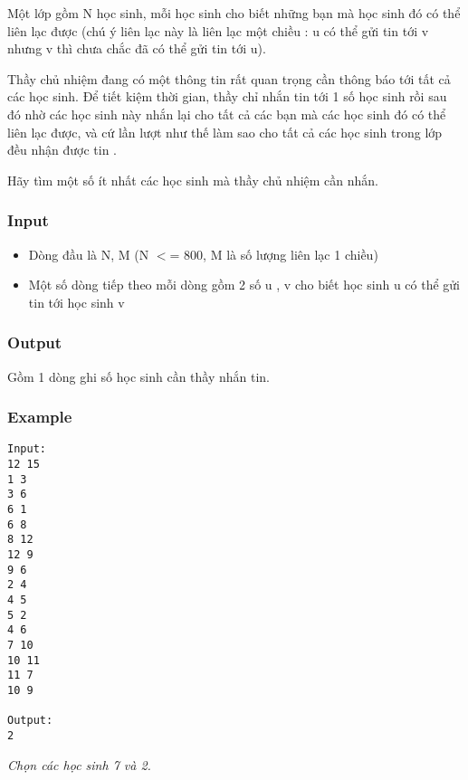 

Một lớp gồm N học sinh, mỗi học sinh cho biết những bạn mà học sinh đó có thể liên lạc được (chú ý liên lạc này là liên lạc một chiều : u có thể gửi tin tới v nhưng v thì chưa chắc đã có thể gửi tin tới u).

Thầy chủ nhiệm đang có một thông tin rất quan trọng cần thông báo tới tất cả các học sinh. Để tiết kiệm thời gian, thầy chỉ nhắn tin tới 1 số học sinh rồi sau đó nhờ các học sinh này nhắn lại cho tất cả các bạn mà các học sinh đó có thể liên lạc được, và cứ lần lượt như thế làm sao cho tất cả các học sinh trong lớp đều nhận được tin .

Hãy tìm một số ít nhất các học sinh mà thầy chủ nhiệm cần nhắn.

\subsubsection{Input}
\begin{itemize}
	\item Dòng đầu là N, M (N $<$= 800, M là số lượng liên lạc 1 chiều)
	\item Một số dòng tiếp theo mỗi dòng gồm 2 số u , v cho biết học sinh u có thể gửi tin tới học sinh v
\end{itemize}

\subsubsection{Output}

Gồm 1 dòng ghi số học sinh cần thầy nhắn tin.

\subsubsection{Example}
\begin{verbatim}
Input:
12 15
1 3
3 6
6 1
6 8
8 12
12 9
9 6
2 4
4 5
5 2
4 6
7 10
10 11
11 7
10 9

Output:
2
\end{verbatim}

\emph{Chọn các học sinh 7 và 2. }